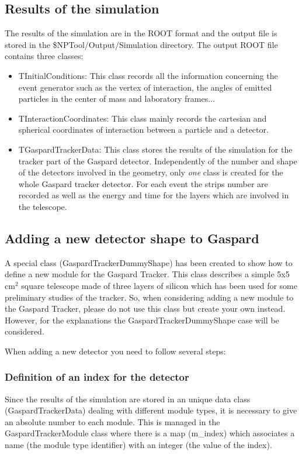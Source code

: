 \documentclass[a4paper,12pt]{article}
\begin{document}
\subsection{Results of the simulation}
The results of the simulation are in the ROOT format and the output file 
is stored in the \$NPTool/Output/Simulation directory. The output ROOT file 
contains three classes:
\begin{itemize}
   \item {TInitialConditions:}
      This class records all the information concerning the event generator
      such as the vertex of interaction, the angles of emitted particles in 
      the center of mass and laboratory frames...
   \item {TInteractionCoordinates:}
      This class mainly records the cartesian and spherical coordinates of 
      interaction between a particle and a detector.
   \item {TGaspardTrackerData:}
      This class stores the results of the simulation for the tracker part 
      of the Gaspard detector. Independently of the number and shape of the 
      detectors involved in the geometry, only {\it one} class is created for 
      the whole Gaspard tracker detector. For each event the strips number 
      are recorded as well as the energy and time for the layers which are 
      involved in the telescope.
\end{itemize}


\subsection{Adding a new detector shape to Gaspard}
A special class (GaspardTrackerDummyShape) has been created to show how
to define a new module for the Gaspard Tracker. This class describes a
simple 5x5 cm$^2$ square telescope made of three layers of silicon which  
has been used for some preliminary studies of the tracker. So, when 
considering adding a new module to the Gaspard Tracker, please do not use
this class but create your own instead. However, for the explanations the 
GaspardTrackerDummyShape case will be considered.

When adding a new detector you need to follow several steps:

\subsubsection{Definition of an index for the detector}
Since the results of the simulation are stored in an unique data class 
(GaspardTrackerData) dealing with different module types, it is 
necessary to give an absolute number to each module. This is managed in
the GaspardTrackerModule class where there is a map (m\_index) which
associates a name (the module type identifier) with an integer (the value 
of the index).
\end{document}
